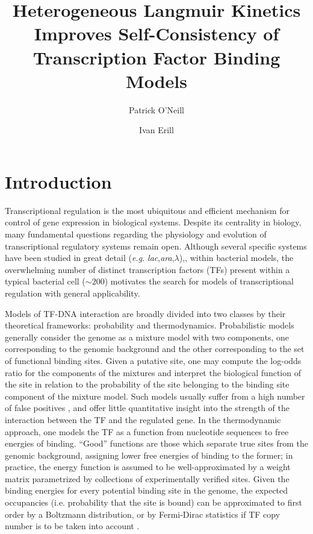 \documentclass{article}
\begin{document}
\title{Heterogeneous Langmuir Kinetics Improves Self-Consistency of Transcription Factor Binding Models}
\author[1]{Patrick O'Neill}
\author[1]{Ivan Erill}
\maketitle{}
\section{Introduction}

\doublespacing Transcriptional regulation is the most ubiquitous and
efficient mechanism for control of gene expression in biological
systems.  Despite its centrality in biology, many fundamental
questions regarding the physiology and evolution of transcriptional
regulatory systems remain open.  Although several specific systems
have been studied in great detail (\textit{e.g.}
\textit{lac},\textit{ara},$\lambda$)\cite{riggs70},\cite{hamilton88},\cite{ptashne67}
within bacterial models, the overwhelming number of distinct
transcription factors (TFs) present within a typical bacterial cell
($\sim 200$) motivates the search for models of transcriptional
regulation with general applicability.

Models of TF-DNA interaction are broadly divided into two classes by
their theoretical frameworks: probability and thermodynamics.
Probabilistic models generally consider the genome as a mixture model
with two components, one corresponding to the genomic background and
the other corresponding to the set of functional binding sites.  Given
a putative site, one may compute the log-odds ratio for the components
of the mixtures and interpret the biological function of the site in
relation to the probability of the site belonging to the binding site
component of the mixture model.  Such models usually suffer from a
high number of false positives \cite{erill09}, and offer little
quantitative insight into the strength of the interaction between the
TF and the regulated gene.  In the thermodynamic approach, one models
the TF as a function from nucleotide sequences to free energies of
binding.  ``Good'' functions are those which separate true sites from
the genomic background, assigning lower free energies of binding to
the former; in practice, the energy function is assumed to be
well-approximated by a weight matrix parametrized by collections of
experimentally verified sites.  Given the binding energies for every
potential binding site in the genome, the expected occupancies
(i.e. probability that the site is bound) can be approximated to first
order by a Boltzmann distribution, or by Fermi-Dirac statistics if TF
copy number is to be taken into account \cite{gerland02}.
\end{document}
